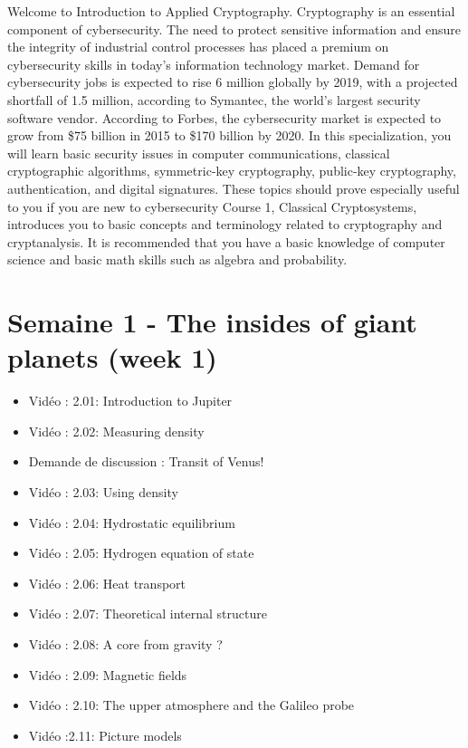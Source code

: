 



Welcome to Introduction to Applied Cryptography.  Cryptography is an essential component of cybersecurity. The need to protect sensitive information and ensure the integrity of industrial control processes has placed a premium on cybersecurity skills in today’s information technology market.  Demand for cybersecurity jobs is expected to rise 6 million globally by 2019, with a projected shortfall of 1.5 million, according to Symantec, the world’s largest security software vendor. According to Forbes, the cybersecurity market is expected to grow from \$75 billion in 2015 to \$170 billion by 2020. In this specialization, you will learn basic security issues in computer communications, classical cryptographic algorithms, symmetric-key cryptography, public-key cryptography, authentication, and digital signatures. These topics should prove especially useful to you if you are new to cybersecurity Course 1, Classical Cryptosystems, introduces you to basic concepts and terminology related to cryptography and cryptanalysis. It is recommended that you have a basic knowledge of computer science and basic math skills such as algebra and probability.





\section*{Semaine 1 - The insides of giant planets (week 1)}


\begin{itemize}[label={$\bullet$}]
    \item Vidéo : 2.01: Introduction to Jupiter
    \item Vidéo : 2.02: Measuring density
    \item Demande de discussion : Transit of Venus!
    \item Vidéo : 2.03: Using density
    \item Vidéo : 2.04: Hydrostatic equilibrium
    \item Vidéo : 2.05: Hydrogen equation of state
    \item Vidéo : 2.06: Heat transport
    \item Vidéo : 2.07: Theoretical internal structure
    \item Vidéo : 2.08: A core from gravity ?
    \item Vidéo : 2.09: Magnetic fields
    \item Vidéo : 2.10: The upper atmosphere and the Galileo probe
    \item Vidéo :2.11: Picture models
\end{itemize}


